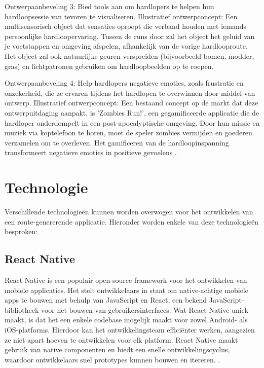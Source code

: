     Ontwerpaanbeveling 3: Bied tools aan om hardlopers te helpen hun hardloopsessie van tevoren te visualiseren. 
    Illustratief ontwerpconcept: Een multisensorisch object dat sensaties oproept die verband houden met iemands persoonlijke hardloopervaring. 
    Tussen de runs door zal het object het geluid van je voetstappen en omgeving afspelen, afhankelijk van de vorige hardlooproute. 
    Het object zal ook natuurlijke geuren verspreiden (bijvoorbeeld bomen, modder, gras) en lichtpatronen gebruiken om hardloopbeelden op te roepen.


    Ontwerpaanbeveling 4: Help hardlopers negatieve emoties, zoals frustratie en onzekerheid, die ze ervaren tijdens het hardlopen te overwinnen 
    door middel van ontwerp. 
    Illustratief ontwerpconcept: Een bestaand concept op de markt dat deze ontwerpuitdaging aanpakt, is 'Zombies Run!', 
    een gegamificeerde applicatie die de hardloper onderdompelt in een post-apocalyptische omgeving. 
    Door hun missie en muziek via koptelefoon te horen, moet de speler zombies vermijden en goederen verzamelen om te overleven. 
    Het gamificeren van de hardloopinspanning transformeert negatieve emoties in positieve gevoelens \autocite{Menheere2020}.


    \section{Technologie}


    Verschillende technologieën kunnen worden overwogen voor het ontwikkelen van een route-genererende applicatie. Hieronder worden enkele van deze technologieën besproken:

    \subsection{React Native}

    React Native is een populair open-source framework voor het ontwikkelen van mobiele applicaties. 
    Het stelt ontwikkelaars in staat om native-achtige mobiele apps te bouwen met behulp van JavaScript en React, een bekend JavaScript-bibliotheek voor het bouwen van gebruikersinterfaces. 
    Wat React Native uniek maakt, is dat het een enkele codebase mogelijk maakt voor zowel Android- als iOS-platforms. Hierdoor kan het ontwikkelingsteam efficiënter werken, 
    aangezien ze niet apart hoeven te ontwikkelen voor elk platform. React Native maakt gebruik van native componenten en biedt een snelle ontwikkelingscyclus, 
    waardoor ontwikkelaars snel prototypes kunnen bouwen en itereren. \autocite{react_native_docs}.

